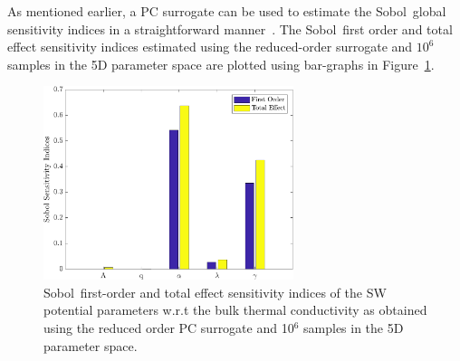As mentioned earlier, a PC surrogate can be used to estimate the Sobol\textquotesingle~global sensitivity indices in a 
straightforward manner~\cite{Sudret:2008}. The Sobol\textquotesingle~first order and total effect sensitivity indices estimated
using the reduced-order surrogate and $10^{6}$ samples in the 5D parameter space are plotted using bar-graphs in
Figure~\ref{fig:gsa}. 

\begin{figure}[htbp]
 \begin{center}
  \includegraphics[width=0.65\textwidth]{./Figures/PCE5D_gsa}
\caption{Sobol\textquotesingle~first-order and total effect sensitivity indices of the SW potential parameters
w.r.t the bulk thermal
conductivity as obtained using the reduced order PC surrogate and 10$^{6}$ samples in the 5D parameter space. }
\label{fig:gsa}
\end{center}
\end{figure}

